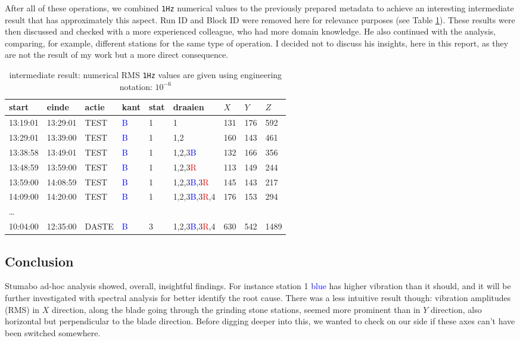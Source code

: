 After all of these operations, we combined \texttt{1Hz} numerical values to the previously prepared metadata to achieve an interesting intermediate result that has approximately this aspect. 
Run ID and Block ID were removed here for relevance purposes (see Table \ref{tab:stu_intermediate_res}).  
These results were then discussed and checked with a more experienced colleague, who had more domain knowledge. 
He also continued with the analysis, comparing, for example, different stations for the same type of operation. 
I decided not to discuss his insights, here in this report, as they are not the result of my work but a more direct consequence.
\begin{table}[ht]
    \centering
    \begin{tabularx}{\textwidth}{@{}lllllllll@{}}
    \toprule
    start & einde & actie & kant & stat & draaien & $X$ & $Y$ & $Z$ \\ \midrule
    13:19:01 & 13:29:01 & TEST & \textcolor{blue}{B} & 1 & 1 & 131 & 176 & 592 \\ 
    13:29:01 & 13:39:00 & TEST & \textcolor{blue}{B} & 1 & 1,2 & 160 & 143 & 461 \\  
    13:38:58 & 13:49:01 & TEST & \textcolor{blue}{B} & 1 & 1,2,3\textcolor{blue}{B} & 132 & 166 & 356 \\ 
    13:48:59 & 13:59:00 & TEST & \textcolor{blue}{B} & 1 & 1,2,3\textcolor{red}{R} & 113 & 149 & 244  \\
    13:59:00 & 14:08:59 & TEST & \textcolor{blue}{B} & 1 & 1,2,3\textcolor{blue}{B},3\textcolor{red}{R} & 145 & 143 & 217 \\ 
    14:09:00 & 14:20:00 & TEST & \textcolor{blue}{B} & 1 & 1,2,3\textcolor{blue}{B},3\textcolor{red}{R},4 & 176 & 153 & 294 \\ 
    \dots \\
    10:04:00 & 12:35:00 & DASTE & \textcolor{blue}{B} & 3 & 1,2,3\textcolor{blue}{B},3\textcolor{red}{R},4 & 630 & 542 & 1489 \\
    \bottomrule
    \end{tabularx}
    \caption{intermediate result: numerical RMS \texttt{1Hz} values are given using engineering notation: $10^{-6}$}
    \label{tab:stu_intermediate_res}
\end{table}

\subsection{Conclusion}
Stumabo ad-hoc analysis showed, overall, insightful findings. For instance station 1 \textcolor{blue}{blue} has higher vibration than it should, 
and it will be further investigated with spectral analysis for better identify the root cause.
There was a less intuitive result though: vibration amplitudes (RMS) in $X$ direction, along the blade going through the grinding stone stations,
seemed more prominent than in $Y$ direction, also horizontal but perpendicular to the blade direction.
Before digging deeper into this, we wanted to check on our side if these axes can't have been switched somewhere.

